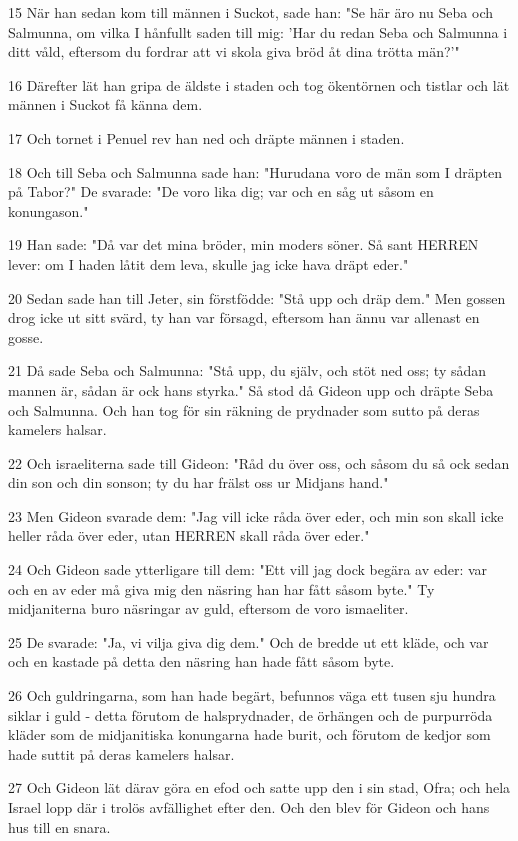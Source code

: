\par 15 När han sedan kom till männen i Suckot, sade han: "Se här äro nu Seba och Salmunna, om vilka I hånfullt saden till mig: 'Har du redan Seba och Salmunna i ditt våld, eftersom du fordrar att vi skola giva bröd åt dina trötta män?'"
\par 16 Därefter lät han gripa de äldste i staden och tog ökentörnen och tistlar och lät männen i Suckot få känna dem.
\par 17 Och tornet i Penuel rev han ned och dräpte männen i staden.
\par 18 Och till Seba och Salmunna sade han: "Hurudana voro de män som I dräpten på Tabor?" De svarade: "De voro lika dig; var och en såg ut såsom en konungason."
\par 19 Han sade: "Då var det mina bröder, min moders söner. Så sant HERREN lever: om I haden låtit dem leva, skulle jag icke hava dräpt eder."
\par 20 Sedan sade han till Jeter, sin förstfödde: "Stå upp och dräp dem." Men gossen drog icke ut sitt svärd, ty han var försagd, eftersom han ännu var allenast en gosse.
\par 21 Då sade Seba och Salmunna: "Stå upp, du själv, och stöt ned oss; ty sådan mannen är, sådan är ock hans styrka." Så stod då Gideon upp och dräpte Seba och Salmunna. Och han tog för sin räkning de prydnader som sutto på deras kamelers halsar.
\par 22 Och israeliterna sade till Gideon: "Råd du över oss, och såsom du så ock sedan din son och din sonson; ty du har frälst oss ur Midjans hand."
\par 23 Men Gideon svarade dem: "Jag vill icke råda över eder, och min son skall icke heller råda över eder, utan HERREN skall råda över eder."
\par 24 Och Gideon sade ytterligare till dem: "Ett vill jag dock begära av eder: var och en av eder må giva mig den näsring han har fått såsom byte." Ty midjaniterna buro näsringar av guld, eftersom de voro ismaeliter.
\par 25 De svarade: "Ja, vi vilja giva dig dem." Och de bredde ut ett kläde, och var och en kastade på detta den näsring han hade fått såsom byte.
\par 26 Och guldringarna, som han hade begärt, befunnos väga ett tusen sju hundra siklar i guld - detta förutom de halsprydnader, de örhängen och de purpurröda kläder som de midjanitiska konungarna hade burit, och förutom de kedjor som hade suttit på deras kamelers halsar.
\par 27 Och Gideon lät därav göra en efod och satte upp den i sin stad, Ofra; och hela Israel lopp där i trolös avfällighet efter den. Och den blev för Gideon och hans hus till en snara.
